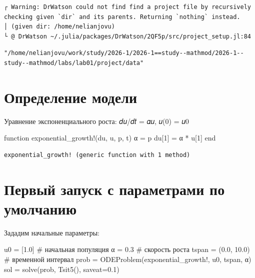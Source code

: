 \documentclass[
  12pt,
  a4paper,
  DIV=11,
  numbers=noendperiod]{scrreprt}
\newenvironment{Shaded}{\begin{snugshade}}{\end{snugshade}}
\newcommand{\CommentTok}[1]{\textcolor[rgb]{0.37,0.37,0.37}{#1}}
\newcommand{\FloatTok}[1]{\textcolor[rgb]{0.68,0.00,0.00}{#1}}
\newcommand{\FunctionTok}[1]{\textcolor[rgb]{0.28,0.35,0.67}{#1}}
\newcommand{\KeywordTok}[1]{\textcolor[rgb]{0.00,0.23,0.31}{#1}}
\newcommand{\NormalTok}[1]{\textcolor[rgb]{0.00,0.23,0.31}{#1}}
\newcommand{\OperatorTok}[1]{\textcolor[rgb]{0.37,0.37,0.37}{#1}}
\begin{document}
\begin{verbatim}
┌ Warning: DrWatson could not find find a project file by recursively checking given `dir` and its parents. Returning `nothing` instead.
│ (given dir: /home/nelianjovu)
└ @ DrWatson ~/.julia/packages/DrWatson/2QF5p/src/project_setup.jl:84
\end{verbatim}

\begin{verbatim}
"/home/nelianjovu/work/study/2026-1/2026-1==study--mathmod/2026-1--study--mathmod/labs/lab01/project/data"
\end{verbatim}

\section{Определение
модели}\label{ux43eux43fux440ux435ux434ux435ux43bux435ux43dux438ux435-ux43cux43eux434ux435ux43bux438}

Уравнение экспоненциального роста: 𝑑𝑢/𝑑𝑡 = 𝛼𝑢, 𝑢(0) = 𝑢0

\begin{Shaded}
\begin{Highlighting}[]
\KeywordTok{function} \FunctionTok{exponential\_growth!}\NormalTok{(du, u, p, t)}
\NormalTok{α }\OperatorTok{=}\NormalTok{ p}
\NormalTok{du[}\FloatTok{1}\NormalTok{] }\OperatorTok{=}\NormalTok{ α }\OperatorTok{*}\NormalTok{ u[}\FloatTok{1}\NormalTok{]}
\KeywordTok{end}
\end{Highlighting}
\end{Shaded}

\begin{verbatim}
exponential_growth! (generic function with 1 method)
\end{verbatim}

\section{Первый запуск с параметрами по
умолчанию}\label{ux43fux435ux440ux432ux44bux439-ux437ux430ux43fux443ux441ux43a-ux441-ux43fux430ux440ux430ux43cux435ux442ux440ux430ux43cux438-ux43fux43e-ux443ux43cux43eux43bux447ux430ux43dux438ux44e}

Зададим начальные параметры:

\begin{Shaded}
\begin{Highlighting}[]
\NormalTok{u0 }\OperatorTok{=}\NormalTok{ [}\FloatTok{1.0}\NormalTok{] }\CommentTok{\# начальная популяция}
\NormalTok{α }\OperatorTok{=} \FloatTok{0.3} \CommentTok{\# скорость роста}
\NormalTok{tspan }\OperatorTok{=}\NormalTok{ (}\FloatTok{0.0}\NormalTok{, }\FloatTok{10.0}\NormalTok{) }\CommentTok{\# временной интервал}
\NormalTok{prob }\OperatorTok{=} \FunctionTok{ODEProblem}\NormalTok{(exponential\_growth!, u0, tspan, α)}
\NormalTok{sol }\OperatorTok{=} \FunctionTok{solve}\NormalTok{(prob, }\FunctionTok{Tsit5}\NormalTok{(), saveat}\OperatorTok{=}\FloatTok{0.1}\NormalTok{)}
\end{Highlighting}
\end{Shaded}
\end{document}
